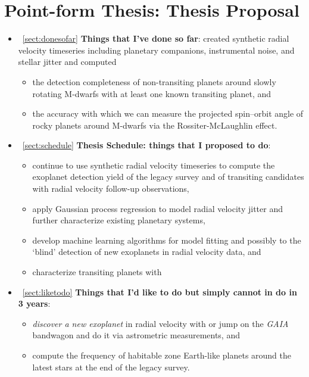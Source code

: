 \section{Point-form Thesis: Thesis Proposal}
\begin{itemize}
\renewcommand\labelitemi{--}
\item~\ref{sect:donesofar} \textbf{Things that I've done so far}: created synthetic radial velocity timeseries 
including planetary companions, instrumental noise, and stellar jitter and computed 
\begin{itemize}
\item the detection completeness of non-transiting planets around slowly rotating M-dwarfs with 
at least one known transiting planet, and
\item the accuracy with which we can measure the projected spin--orbit angle of rocky planets 
around M-dwarfs via the Rossiter-McLaughlin effect.
\end{itemize}
\item~\ref{sect:schedule} \textbf{Thesis Schedule: things that I proposed to do}: 
\begin{itemize}
\item continue to use synthetic radial velocity timeseries to compute the exoplanet detection yield 
of the \spirou{} legacy survey and of transiting candidates with radial velocity follow-up observations,
\item apply Gaussian process regression to model radial velocity jitter and further characterize 
existing planetary systems, 
\item develop machine learning algorithms for model fitting and possibly to the `blind' detection 
of new exoplanets in radial velocity data, and
\item characterize transiting planets with 
\end{itemize}
\item~\ref{sect:liketodo} \textbf{Things that I'd like to do but simply cannot in do in 3 years}: 
\begin{itemize}
\item \emph{discover a new exoplanet} 
in radial velocity with \spirou{} or jump on the \emph{GAIA} bandwagon 
and do it via astrometric measurements, and
\item compute the frequency of habitable zone Earth-like planets around the latest stars at the 
end of the \spirou{} legacy survey.
\end{itemize} 
\end{itemize}
